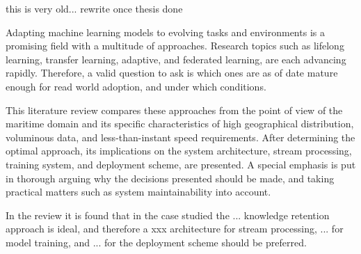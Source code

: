 
this is very old... rewrite once thesis done

Adapting machine learning models to evolving tasks and environments is a promising field with a multitude of approaches. Research topics such as lifelong learning, transfer learning, adaptive, and federated learning, are each advancing rapidly. Therefore, a valid question to ask is which ones are as of date mature enough for read world adoption, and under which conditions.

This literature review compares these approaches from the point of view of the maritime domain and its specific characteristics of high geographical distribution, voluminous data, and less-than-instant speed requirements. After determining the optimal approach, its implications on the system architecture, stream processing, training system, and deployment scheme, are presented. A special emphasis is put in thorough arguing why the decisions presented should be made, and taking practical matters such as system maintainability into account.

In the review it is found that in the case studied the ... knowledge retention approach is ideal, and therefore a xxx architecture for stream processing,  ... for model training, and ... for the deployment scheme should be preferred. %



  


